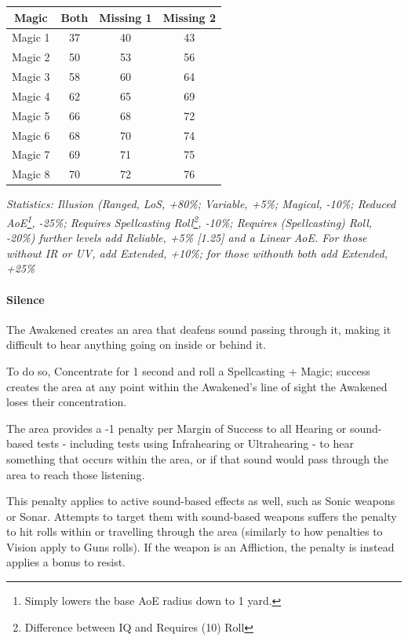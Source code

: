 \begin{multicols*}{3}
	\begin{center}
		\begin{adjustwidth}{-2.5mm}{}
		\begin{tabular}{|c|c|c|c|}
			\hline
			Magic & Both & Missing 1 & Missing 2 \\
			\hline
			\hline
			Magic 1 & 37 & 40 & 43 \\
			Magic 2 & 50 & 53 & 56 \\
			Magic 3 & 58 & 60 & 64 \\
			Magic 4 & 62 & 65 & 69 \\
			Magic 5 & 66 & 68 & 72 \\
			Magic 6 & 68 & 70 & 74 \\
			Magic 7 & 69 & 71 & 75 \\
			Magic 8 & 70 & 72 & 76 \\
			\hline
		\end{tabular}
		\end{adjustwidth}
	\end{center}
	
	\textcolor{OliveGreen}{\textit{Statistics: Illusion (Ranged, LoS, +80\%; Variable, +5\%; Magical, -10\%; Reduced AoE\footnote{Simply lowers the base AoE radius down to 1 yard.}, -25\%; Requires Spellcasting Roll\footnote{Difference between IQ and Requires (10) Roll}, -10\%; Requires (Spellcasting) Roll, -20\%) further levels add Reliable, +5\% [1.25] and a Linear AoE. For those without IR or UV, add Extended, +10\%; for those withouth both add Extended, +25\%}}
	
	\paragraph{Silence}
	
	The Awakened creates an area that deafens sound passing through it, making it difficult to hear anything going on inside or behind it.
	
	To do so, Concentrate for 1 second and roll a Spellcasting + Magic; success creates the area at any point within the Awakened's line of sight the Awakened loses their concentration.
	
	The area provides a -1 penalty per Margin of Success to all Hearing or sound-based tests - including tests using Infrahearing or Ultrahearing - to hear something that occurs within the area, or if that sound would pass through the area to reach those listening.
	
	This penalty applies to active sound-based effects as well, such as Sonic weapons or Sonar. Attempts to target them with sound-based weapons suffers the penalty to hit rolls within or travelling through the area (similarly to how penalties to Vision apply to Guns rolls). If the weapon is an Affliction, the penalty is instead applies a bonus to resist.
	

\end{multicols*}
